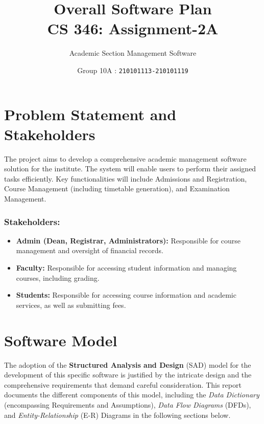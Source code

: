 \documentclass[12pt,a4paper]{article}
\begin{document}
\title{\huge \textbf{Overall Software Plan} \\ \LARGE {\textbf{CS 346: Assignment-2A}}}
\author{\Large Academic Section Management Software}
\date{Group 10A : \texttt{210101113-210101119}}
\maketitle


\section{Problem Statement and Stakeholders}
The project aims to develop a comprehensive academic management software solution for the institute. The system will enable users to perform their assigned tasks efficiently. Key functionalities will include Admissions and Registration, Course Management (including timetable generation), and Examination Management.

\subsubsection*{Stakeholders:}
\begin{itemize}
    \item \textbf{Admin (Dean, Registrar, Administrators):} Responsible for course management and oversight of financial records.
    \item \textbf{Faculty:} Responsible for accessing student information and managing courses, including grading.
    \item \textbf{Students:} Responsible for accessing course information and academic services, as well as submitting fees.
\end{itemize}

\section{Software Model}
The adoption of the \textbf{Structured Analysis and Design} (SAD) model for the development of this specific software is justified by the intricate design and the comprehensive requirements that demand careful consideration. This report documents the different components of this model, including the \textit{Data Dictionary} (encompassing Requirements and Assumptions), \textit{Data Flow Diagrams} (DFDs), and \textit{Entity-Relationship} (E-R) Diagrams in the following sections below.
    
\end{document}
